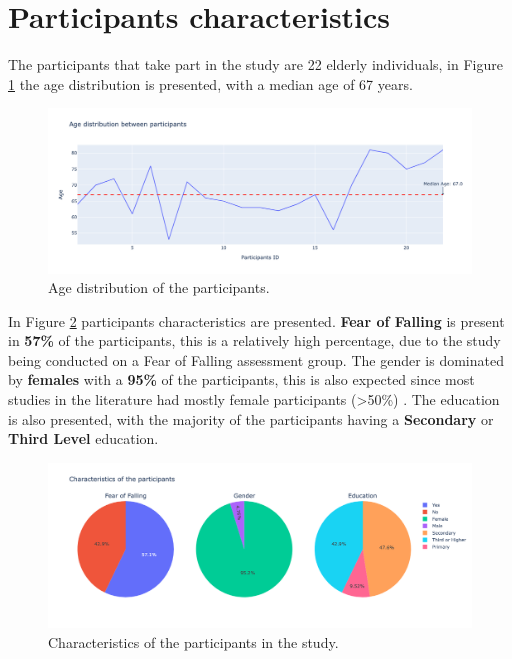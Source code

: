     \section{Participants characteristics}
        The participants that take part in the study are 22 elderly individuals, in Figure \ref{fig:age_distribution} the age distribution is presented, with a median age of 67 years. 
        \newpage 
        \begin{figure}[H]
            \centering
            \includegraphics[width=1.0\textwidth]{./resources/plots/participants/age.png}
            \caption{Age distribution of the participants.}
            \label{fig:age_distribution}
        \end{figure}

        In Figure \ref{fig:patients_characteristics} participants characteristics are presented. \textbf{Fear of Falling} is present in \textbf{57\%} of the participants, this is a relatively high percentage, due to the study being conducted on a Fear of Falling assessment group. The gender is dominated by \textbf{females} with a \textbf{95\%} of the participants, this is also expected since most studies in the literature had mostly female participants (>50\%) \cite{mackay_fear_2021}. The education is also presented, with the majority of the participants having a \textbf{Secondary} or \textbf{Third Level} education.
        
        \begin{figure}[H]
            \centering
            \includegraphics[width=1.0\textwidth]{./resources/plots/participants/chars.png}
            \caption{Characteristics of the participants in the study.}
            \label{fig:patients_characteristics}
        \end{figure}

